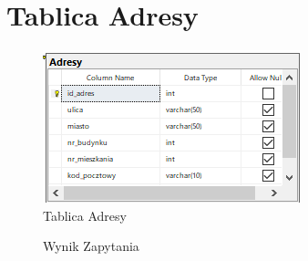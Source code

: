 \section*{Tablica Adresy}
\par{

\begin{figure}[h!]
    \centering
   \includegraphics{Images/Zadanie2/Adresy.png}
    \caption{Tablica Adresy}
    \label{fig:my_label}
\end{figure}


\begin{figure}[h!]
    \centering
    \caption{Wynik Zapytania}
    \label{fig:my_label}
\end{figure}
}